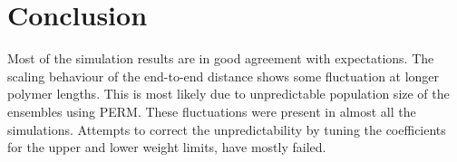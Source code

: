 \section{Conclusion}
Most of the simulation results are in good agreement with expectations. The scaling behaviour of the end-to-end distance shows some fluctuation at longer polymer lengths. This is most likely due to unpredictable population size of the ensembles using PERM. These fluctuations were present in almost all the simulations. Attempts to correct the unpredictability by tuning the coefficients for the upper and lower weight limits, have mostly failed.